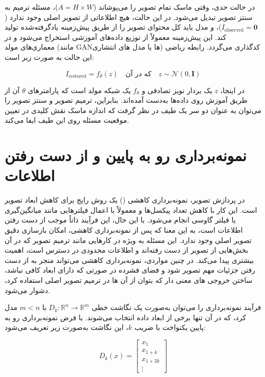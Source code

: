 در حالت حدی، وقتی ماسک تمام تصویر را می‌پوشاند ($A = H \times W$)، مسئله ترمیم به سنتز تصویر%
تبدیل می‌شود. در این حالت، هیچ اطلاعاتی از تصویر اصلی وجود ندارد ($I_{\text{observed}} = \mathbf{0}$)، و مدل باید کل محتوای تصویر را از طریق پیش‌زمینه یادگرفته‌شده%
تولید کند. این پیش‌زمینه معمولاً از توزیع داده‌های آموزشی استخراج می‌شود و در معماری‌های مولد (مانند GAN‌ها یا مدل های انتشاری) کدگذاری می‌گردد. رابطه ریاضی این حالت به صورت زیر است:

$$
I_{\text{restored}} = f_{\theta}(z) \quad \text{که در آن} \quad z \sim \mathcal{N}(0, \mathbf{I})
$$

در اینجا، $z$ یک بردار نویز تصادفی و $f_{\theta}$ یک شبکه مولد است که پارامترهای $\theta$ آن از طریق آموزش روی داده‌ها به‌دست آمده‌اند. بنابراین، ترمیم تصویر و سنتز تصویر را می‌توان به عنوان دو سر یک طیف در نظر گرفت که اندازه ماسک نقش کلیدی در تعیین موقعیت مسئله روی این طیف ایفا می‌کند.




\section{نمونه‌برداری رو به پایین و از دست رفتن اطلاعات}

در پردازش تصویر، نمونه‌برداری کاهشی () یک روش رایج برای کاهش ابعاد تصویر است. این کار با کاهش تعداد پیکسل‌ها و معمولاً با اعمال فیلترهایی مانند میانگین‌گیری یا فیلتر گاوسی انجام می‌شود. با این حال، این فرآیند ذاتاً موجب از دست رفتن اطلاعات است، به این معنا که پس از نمونه‌برداری کاهشی، امکان بازسازی دقیق تصویر اصلی وجود ندارد. این مسئله به ویژه در کارهایی مانند ترمیم تصویر که در آن بخش‌هایی از تصویر از دست رفته‌اند و اطلاعات محدودی در دسترس است، اهمیت بیشتری پیدا می‌کند. در چنین مواردی، نمونه‌برداری کاهشی می‌تواند منجر به از دست رفتن جزئیات مهم تصویر شود و فضای فشرده در صورتی که دارای ابعاد کافی نباشد،‌ ساختن خروجی های معنی دار که بتوان از آن ها در ترمیم تصویر اصلی استفاده کرد، دشوار می‌شود.

فرآیند نمونه‌برداری را می‌توان به‌صورت یک نگاشت خطی \( D_k: \mathbb{R}^n \to \mathbb{R}^m \) با \( m < n \) مدل کرد، که در آن تنها برخی از ابعاد داده انتخاب می‌شوند. با فرض نمونه‌برداری رو به پایین یکنواخت با ضریب $k$، این نگاشت به‌صورت زیر تعریف می‌شود:

\[
D_k(x) = \begin{bmatrix} 
	x_1 \\ 
	x_{1+k} \\ 
	x_{1+2k} \\ 
	\vdots 
\end{bmatrix}
\]

